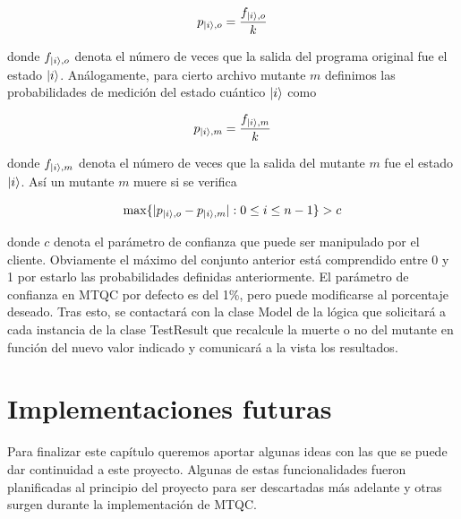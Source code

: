 \begin{equation}
p_{\left|i\right\rangle,o}=\dfrac{f_{\left|i\right\rangle,o}}{k}
\end{equation}

donde $f_{\left|i\right\rangle,o}$ denota el número de veces que la salida del programa original fue el estado $\left|i\right\rangle$. Análogamente, para cierto archivo mutante $m$ definimos las probabilidades de medición del estado cuántico $\left|i\right\rangle$ como

\begin{equation}
p_{\left|i\right\rangle,m}=\dfrac{f_{\left|i\right\rangle,m}}{k}
\end{equation}

donde $f_{\left|i\right\rangle,m}$ denota el número de veces que la salida del mutante $m$ fue el estado $\left|i\right\rangle$. Así un mutante $m$ muere si se verifica

\begin{equation}
\max \{|p_{\left|i\right\rangle,o}-p_{\left|i\right\rangle,m}|:0\leq i\leq n - 1\}> c
\end{equation}

donde $c$ denota el parámetro de confianza que puede ser manipulado por el cliente. Obviamente el máximo del conjunto anterior está comprendido entre 0 y 1 por estarlo las probabilidades definidas anteriormente. El parámetro de confianza en MTQC por defecto es del 1\%, pero puede modificarse al porcentaje deseado. Tras esto, se contactará con la clase Model de la lógica que solicitará a cada instancia de la clase TestResult que recalcule la muerte o no del mutante en función del nuevo valor indicado y comunicará a la vista los resultados.

\section{Implementaciones futuras}

Para finalizar este capítulo queremos aportar algunas ideas con las que se puede dar continuidad a este proyecto. Algunas de estas funcionalidades fueron planificadas al principio del proyecto para ser descartadas más adelante y otras surgen durante la implementación de MTQC.

